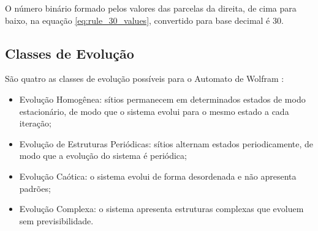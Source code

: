 \vspace{5mm}
O número binário formado pelos valores das parcelas da direita, de cima para
baixo, na equação \ref{eq:rule_30_values}, convertido para base decimal é 30.

\subsection{Classes de Evolução}

São quatro as classes de evolução possíveis para o Automato de Wolfram
\cite{Atman:2002:Sistemas:Complexos}:

\begin{itemize}
  \item Evolução Homogênea: sítios permanecem em determinados estados de modo
  estacionário, de modo que o sistema evolui para o mesmo estado a cada
  iteração;

  \item Evolução de Estruturas Periódicas: sítios alternam estados
  periodicamente, de modo que a evolução do sistema é periódica;

  \item Evolução Caótica: o sistema evolui de forma desordenada e não apresenta
  padrões;

  \item Evolução Complexa: o sistema apresenta estruturas complexas que evoluem
  sem previsibilidade.
\end{itemize}
